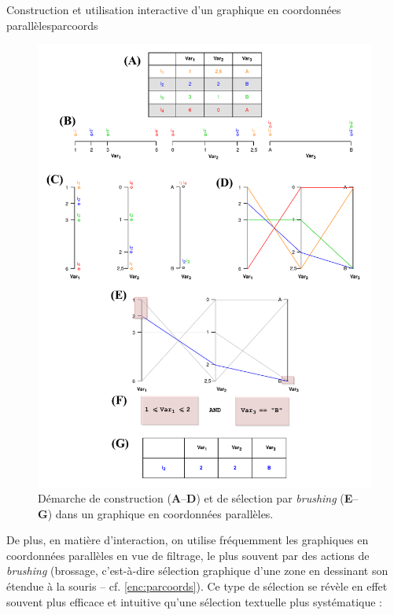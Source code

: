 	\begin{encadre}{Construction et utilisation interactive d'un graphique en coordonnées parallèles}{parcoords}

			\begin{figure}[H]
			\captionsetup{width=\linewidth}
			\includegraphics[width=\linewidth]{img/ParCoords_Brush.pdf}
			\caption{Démarche de construction (\textbf{A}--\textbf{D}) et de sélection par \textit{brushing} (\textbf{E}--\textbf{G}) dans un graphique en coordonnées parallèles.}
			\label{fig:schema_parcoords}
		\end{figure}

	\end{encadre}



	De plus, en matière d'interaction, on utilise fréquemment les graphiques en coordonnées parallèles en vue de filtrage, le plus souvent par des actions de \textit{brushing} (\og brossage\fg{}, c'est-à-dire sélection graphique d'une zone en dessinant son étendue à la souris -- cf. \cref{enc:parcoords}).
	Ce type de sélection se révèle en effet souvent plus efficace et intuitive qu'une sélection textuelle plus systématique :


